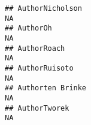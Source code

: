 \documentclass[]{article}
\begin{document}
\begin{verbatim}
## AuthorNicholson                                                                                                                                                                                                                                                                                                                                                                                                                                                                         NA
## AuthorOh                                                                                                                                                                                                                                                                                                                                                                                                                                                                                NA
## AuthorRoach                                                                                                                                                                                                                                                                                                                                                                                                                                                                             NA
## AuthorRuisoto                                                                                                                                                                                                                                                                                                                                                                                                                                                                           NA
## Authorten Brinke                                                                                                                                                                                                                                                                                                                                                                                                                                                                        NA
## AuthorTworek                                                                                                                                                                                                                                                                                                                                                                                                                                                                            NA

\end{verbatim}
\end{document}
